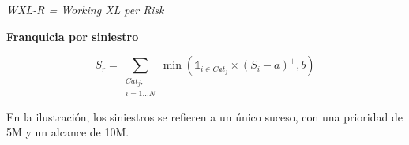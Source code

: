 \begin{f}
\begin{center}
	\emph {WXL-R = Working XL per Risk}
\end{center}
	\medskip


\textbf{Franquicia por siniestro}
	
	\[
	S_r= \sum_{\begin{array}{c}
			Cat_j,\\ i=1\ldots N
	\end{array}} \min\left( \mathds{1}_{i\in Cat_j}\times \left( S_i-a\right)^+,b\right)  
	\]
	
	En la ilustración, los siniestros se refieren a un único suceso, con una prioridad de 5M\EUR{} y un alcance de 10M\EUR{}.
	


\end{f}
